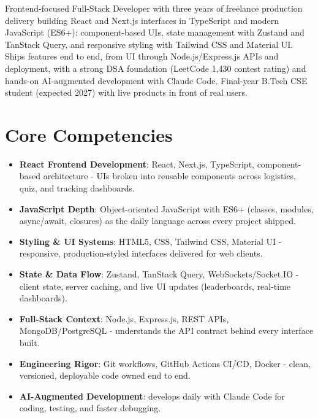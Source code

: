 \documentclass[11pt,a4paper,sans]{moderncv}
\begin{document}
\makecvtitle


\vspace{6pt}
\small{Frontend-focused Full-Stack Developer with three years of freelance production delivery building React and Next.js interfaces in TypeScript and modern JavaScript (ES6+): component-based UIs, state management with Zustand and TanStack Query, and responsive styling with Tailwind CSS and Material UI. Ships features end to end, from UI through Node.js/Express.js APIs and deployment, with a strong DSA foundation (LeetCode 1,430 contest rating) and hands-on AI-augmented development with Claude Code. Final-year B.Tech CSE student (expected 2027) with live products in front of real users.}


\section{Core Competencies}
\vspace{1pt}
\begin{itemize}

\item \textbf{React Frontend Development}: React, Next.js, TypeScript, component-based architecture - UIs broken into reusable components across logistics, quiz, and tracking dashboards.

\item \textbf{JavaScript Depth}: Object-oriented JavaScript with ES6+ (classes, modules, async/await, closures) as the daily language across every project shipped.

\item \textbf{Styling \& UI Systems}: HTML5, CSS, Tailwind CSS, Material UI - responsive, production-styled interfaces delivered for web clients.

\item \textbf{State \& Data Flow}: Zustand, TanStack Query, WebSockets/Socket.IO - client state, server caching, and live UI updates (leaderboards, real-time dashboards).

\item \textbf{Full-Stack Context}: Node.js, Express.js, REST APIs, MongoDB/PostgreSQL - understands the API contract behind every interface built.

\item \textbf{Engineering Rigor}: Git workflows, GitHub Actions CI/CD, Docker - clean, versioned, deployable code owned end to end.

\item \textbf{AI-Augmented Development}: develops daily with Claude Code for coding, testing, and faster debugging.

\end{itemize}
\end{document}
